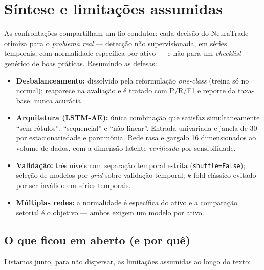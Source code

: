 \section{Síntese e limitações assumidas}
\label{sec:debate-sintese}

As confrontações compartilham um fio condutor: cada decisão do NeuraTrade
otimiza para o \emph{problema real} --- detecção não supervisionada, em séries
temporais, com normalidade específica por ativo --- e não para um \emph{checklist}
genérico de boas práticas. Resumindo as defesas:

\begin{itemize}[noitemsep]
  \item \textbf{Desbalanceamento:} dissolvido pela reformulação \emph{one-class}
        (treina só no normal); reaparece na avaliação e é tratado com P/R/F1 e
        reporte da taxa-base, nunca acurácia.
  \item \textbf{Arquitetura (LSTM-AE):} única combinação que satisfaz
        simultaneamente ``sem rótulos'', ``sequencial'' e ``não linear''. Entrada
        univariada e janela de 30 por estacionariedade e parcimônia. Rede rasa e
        gargalo 16 dimensionados ao volume de dados, com a dimensão latente
        \emph{verificada} por sensibilidade.
  \item \textbf{Validação:} três níveis com separação temporal estrita
        (\texttt{shuffle=False}); seleção de modelos por \emph{grid} sobre
        validação temporal; $k$-fold clássico evitado por ser inválido em séries
        temporais.
  \item \textbf{Múltiplas redes:} a normalidade é específica do ativo e a
        comparação setorial é o objetivo --- ambos exigem um modelo por ativo.
\end{itemize}

\subsection{O que ficou em aberto (e por quê)}
Listamos junto, para não dispersar, as limitações assumidas ao longo do texto:

